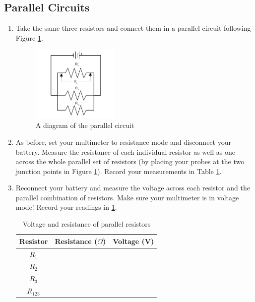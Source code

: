 \subsection{Parallel Circuits}
\begin{enumerate}
	\item Take the same three resistors and connect them in a parallel circuit following Figure \ref{fig:voltparallel}.

	\begin{figure}[h]
	\centering
	\includegraphics[width=0.4\textwidth]{./Exp2/pic/voltparallel.png}
	\caption{A diagram of the parallel circuit}
	\label{fig:voltparallel}
	\end{figure}

	\item As before, set your multimeter to resistance mode and disconnect your battery. Measure the resistance of each individual resistor as well as one across the whole parallel set of resistors (by placing your probes at the two junction points in Figure \ref{fig:voltparallel}). Record your measurements in Table \ref{tab:paralleltable}.

	\item Reconnect your battery and measure the voltage across each resistor and the parallel combination of resistors. Make sure your multimeter is in voltage mode! Record your readings in \ref{tab:paralleltable}.

	\begin{table}
	\begin{center}
	\begin{tabular}{| c | c | c |}
	\hline
		Resistor & Resistance ($\Omega$) & Voltage (V)\\
		\hline
		$R_1$ & &\\
		\hline
		$R_2$ & &\\
		\hline
		$R_3$ & &\\
		\hline
		$R_{123}$ & &\\
		\hline
	\end{tabular}
	\end{center}
	\caption{Voltage and resistance of parallel resistors}
	\label{tab:paralleltable}
	\end{table}


\end{enumerate}
